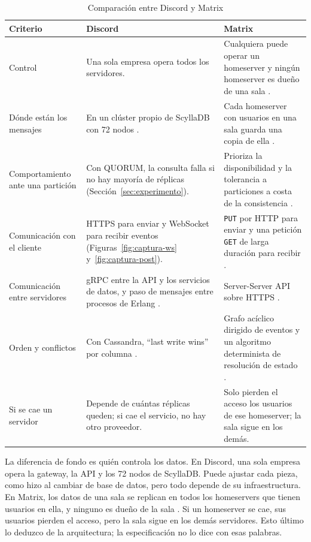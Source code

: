 \documentclass[11pt,a4paper]{article}
\begin{document}
\begin{table}[H]
  \centering
  \small
  \caption{Comparación entre Discord y Matrix}
  \label{tab:comparativa}
  \begin{tabularx}{\textwidth}{@{}p{2.6cm}XX@{}}
    \toprule
    \textbf{Criterio} & \textbf{Discord} & \textbf{Matrix} \\
    \midrule
    Control & Una sola empresa opera todos los servidores. & Cualquiera puede operar un homeserver y ningún homeserver es dueño de una sala \cite{MatrixSpec,Martins2026}. \\
    Dónde están los mensajes & En un clúster propio de ScyllaDB con 72 nodos \cite{Ingram2023}. & Cada homeserver con usuarios en una sala guarda una copia de ella \cite{MatrixSpec}. \\
    Comportamiento ante una partición & Con QUORUM, la consulta falla si no hay mayoría de réplicas (Sección~\ref{sec:experimento}). & Prioriza la disponibilidad y la tolerancia a particiones a costa de la consistencia \cite{MatrixSpec}. \\
    Comunicación con el cliente & HTTPS para enviar y WebSocket para recibir eventos (Figuras~\ref{fig:captura-ws} y~\ref{fig:captura-post}). & \texttt{PUT} por HTTP para enviar y una petición \texttt{GET} de larga duración para recibir \cite{MatrixSpec}. \\
    Comunicación entre servidores & gRPC entre la API y los servicios de datos, y paso de mensajes entre procesos de Erlang \cite{Ingram2023,Vishnevskiy2017elixir}. & Server-Server API sobre HTTPS \cite{MatrixSpec}. \\
    Orden y conflictos & Con Cassandra, \enquote{last write wins} por columna \cite{Vishnevskiy2017billions}. & Grafo acíclico dirigido de eventos y un algoritmo determinista de resolución de estado \cite{MatrixSpec,Martins2026}. \\
    Si se cae un servidor & Depende de cuántas réplicas queden; si cae el servicio, no hay otro proveedor. & Solo pierden el acceso los usuarios de ese homeserver; la sala sigue en los demás. \\
    \bottomrule
  \end{tabularx}
\end{table}

La diferencia de fondo es quién controla los datos. En Discord, una sola empresa opera la gateway, la API y los 72 nodos de ScyllaDB. Puede ajustar cada pieza, como hizo al cambiar de base de datos, pero todo depende de su infraestructura. En Matrix, los datos de una sala se replican en todos los homeservers que tienen usuarios en ella, y ninguno es dueño de la sala \cite{MatrixSpec}. Si un homeserver se cae, sus usuarios pierden el acceso, pero la sala sigue en los demás servidores. Esto último lo deduzco de la arquitectura; la especificación no lo dice con esas palabras.
\end{document}
